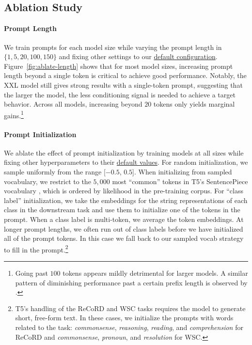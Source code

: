 \subsection{Ablation Study}
\label{sec:ablations}

\paragraph{Prompt Length} We train prompts for each model size while varying the prompt length in $\{1, 5, 20, 100, 150\}$ and fixing other settings to our \hyperref[settings:default]{default configuration}. Figure~\ref{fig:ablate-length} shows that for most model sizes, increasing prompt length beyond a single token is critical to achieve good performance. Notably, the XXL model still gives strong results with a single-token prompt, suggesting that the larger the model, the less conditioning signal is needed to achieve a target behavior. Across all models, increasing beyond $20$ tokens only yields marginal gains.\footnote{Going past $100$ tokens appears mildly detrimental for larger models. A similar pattern of diminishing performance past a certain prefix length is observed by \citet{li_2021_prefix_tuning}.}

\paragraph{Prompt Initialization} We ablate the effect of prompt initialization by training models at all sizes while fixing other hyperparameters to their \hyperref[settings:default]{default values}. For random initialization, we sample uniformly from the range [$-0.5$, $0.5$]. When initializing from sampled vocabulary, we restrict to the $5{,}000$ most ``common'' tokens in T5's SentencePiece vocabulary \cite{kudo2018sentencepiece}, which is ordered by likelihood in the pre-training corpus. For ``class label'' initialization, we take the embeddings for the string representations of each class in the downstream task and use them to initialize one of the tokens in the prompt. When a class label is multi-token, we average the token embeddings. At longer prompt lengths, we often run out of class labels before we have initialized all of the prompt tokens. In this case we fall back to our sampled vocab strategy to fill in the prompt.\footnote{T5's handling of the ReCoRD and WSC tasks requires the model to generate short, free-form text. In these cases, we initialize the prompts with words related to the task: \textit{commonsense}, \textit{reasoning}, \textit{reading}, and \textit{comprehension} for ReCoRD and \textit{commonsense}, \textit{pronoun}, and \textit{resolution} for WSC.}

